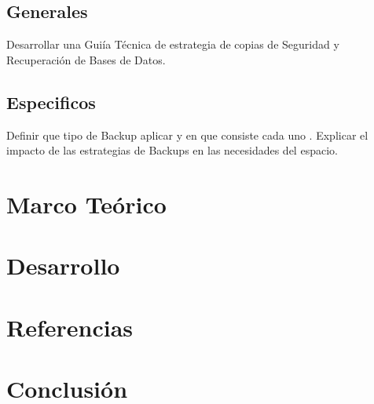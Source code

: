 \documentclass[a4paper,twocolumn,10pt]{article}
\begin{document}
    \subsection{Generales}
       \normalsize Desarrollar una Gui\'ia T\'ecnica de estrategia de copias de Seguridad y Recuperaci\'on de Bases de Datos.
    \subsection{Especificos}
       \normalsize Definir que tipo de Backup aplicar y en que consiste cada uno . Explicar el impacto de las estrategias de Backups en las necesidades del espacio.

\section{Marco Te\'orico}
\section{Desarrollo}
\section{Referencias}
\section{Conclusi\'on}
\end{document}
